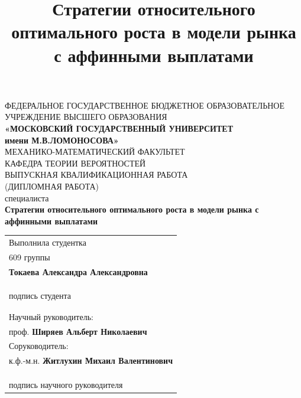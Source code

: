 \documentclass[a4paper,12pt,russian]{article} %
\title{Стратегии относительного оптимального роста в модели рынка с аффинными выплатами}
\author{}
\date{}
\theoremstyle{definition}
\begin{document}
\begin{center}
    \footnotesize{ФЕДЕРАЛЬНОЕ ГОСУДАРСТВЕННОЕ БЮДЖЕТНОЕ ОБРАЗОВАТЕЛЬНОЕ}\\ 
    \footnotesize{УЧРЕЖДЕНИЕ ВЫСШЕГО ОБРАЗОВАНИЯ}\\
    \small{\textbf{«МОСКОВСКИЙ ГОСУДАРСТВЕННЫЙ УНИВЕРСИТЕТ}}\\
    \small{\textbf{имени М.В.ЛОМОНОСОВА»}}\\
    \hfill \break
    \normalsize{МЕХАНИКО-МАТЕМАТИЧЕСКИЙ ФАКУЛЬТЕТ}\\
     \hfill \break
    \normalsize{КАФЕДРА ТЕОРИИ ВЕРОЯТНОСТЕЙ}\\
    \hfill\break
    \hfill \break
    \hfill \break
    \large{ВЫПУСКНАЯ КВАЛИФИКАЦИОННАЯ РАБОТА}\\
    \large{(ДИПЛОМНАЯ РАБОТА)}\\
    \large{специалиста}\\
    \hfill \break
    \hfill \break
    \textbf{Стратегии относительного оптимального роста в модели рынка с аффинными выплатами}\\
\end{center}
    \hfill \break
    \hfill \break
    
    \hfill
\begin{tabular}{@{}l@{}}
    Выполнила студентка\\
    609 группы \\
    \textbf{Токаева Александра Александровна} \\
    \hfill \\
    \hfill \\
    \underline{\hspace{3cm}} \\
    подпись студента \\
    \hfill \\
    \hfill \\
    
    Научный руководитель: \\
    проф. \textbf{Ширяев Альберт Николаевич} \\

  
    Соруководитель: \\
    к.ф.-м.н. \textbf{Житлухин Михаил Валентинович} \\
    \hfill \\
    \hfill \\
    \underline{\hspace{3cm}} \\
    
    подпись научного руководителя \\

    
\end{tabular}
    
\end{document}
